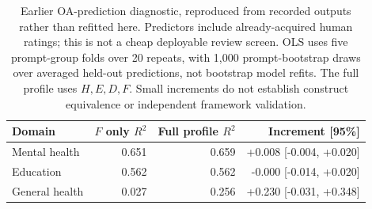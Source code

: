 \begin{table}[htbp]
\centering\small
\caption{Earlier OA-prediction diagnostic, reproduced from recorded outputs rather than refitted here. Predictors include already-acquired human ratings; this is not a cheap deployable review screen. OLS uses five prompt-group folds over 20 repeats, with 1,000 prompt-bootstrap draws over averaged held-out predictions, not bootstrap model refits. The full profile uses $H,E,D,F$. Small increments do not establish construct equivalence or independent framework validation.}
\label{tab:measurementbridge}
\begin{tabular}{lrrr}
\toprule
Domain & $F$ only $R^2$ & Full profile $R^2$ & Increment [95\%] \\
\midrule
Mental health & 0.651 & 0.659 & +0.008 [-0.004, +0.020] \\
Education & 0.562 & 0.562 & -0.000 [-0.014, +0.020] \\
General health & 0.027 & 0.256 & +0.230 [-0.031, +0.348] \\
\bottomrule
\end{tabular}
\end{table}
